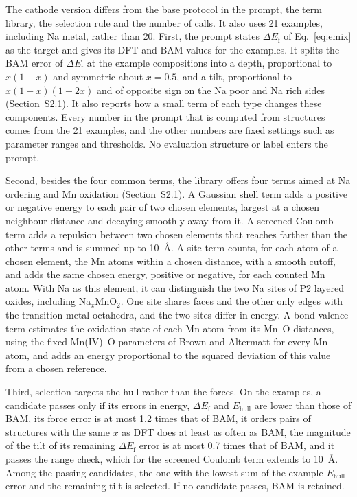 The cathode version differs from the base protocol in the prompt, the term library, the selection rule and the number of calls. It also uses 21 examples, including Na metal, rather than 20. First, the prompt states $\Delta E_\mathrm{f}$ of Eq.~\eqref{eq:emix} as the target and gives its DFT and BAM values for the examples. It splits the BAM error of $\Delta E_\mathrm{f}$ at the example compositions into a depth, proportional to $x(1-x)$ and symmetric about $x=0.5$, and a tilt, proportional to $x(1-x)(1-2x)$ and of opposite sign on the Na poor and Na rich sides (Section~S2.1). It also reports how a small term of each type changes these components. Every number in the prompt that is computed from structures comes from the 21 examples, and the other numbers are fixed settings such as parameter ranges and thresholds. No evaluation structure or label enters the prompt.

Second, besides the four common terms, the library offers four terms aimed at Na ordering and Mn oxidation (Section~S2.1). A Gaussian shell term adds a positive or negative energy to each pair of two chosen elements, largest at a chosen neighbour distance and decaying smoothly away from it. A screened Coulomb term adds a repulsion between two chosen elements that reaches farther than the other terms and is summed up to 10~\AA. A site term counts, for each atom of a chosen element, the Mn atoms within a chosen distance, with a smooth cutoff, and adds the same chosen energy, positive or negative, for each counted Mn atom. With Na as this element, it can distinguish the two Na sites of P2 layered oxides, including Na$_x$MnO$_2$. One site shares faces and the other only edges with the transition metal octahedra, and the two sites differ in energy.\cite{hinuma2008naxcoo2,zheng2017p2mixing} A bond valence term estimates the oxidation state of each Mn atom from its Mn--O distances, using the fixed Mn(IV)--O parameters of Brown and Altermatt for every Mn atom,\cite{brown1985bvs} and adds an energy proportional to the squared deviation of this value from a chosen reference.

Third, selection targets the hull rather than the forces. On the examples, a candidate passes only if its errors in energy, $\Delta E_\mathrm{f}$ and $E_\mathrm{hull}$ are lower than those of BAM, its force error is at most 1.2 times that of BAM, it orders pairs of structures with the same $x$ as DFT does at least as often as BAM, the magnitude of the tilt of its remaining $\Delta E_\mathrm{f}$ error is at most 0.7 times that of BAM, and it passes the range check, which for the screened Coulomb term extends to 10~\AA. Among the passing candidates, the one with the lowest sum of the example $E_\mathrm{hull}$ error and the remaining tilt is selected. If no candidate passes, BAM is retained.

